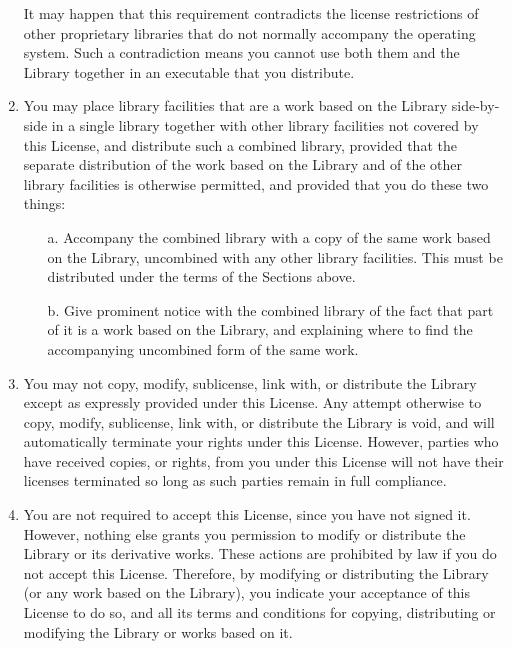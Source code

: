 \begin{enumerate}
  It may happen that this requirement contradicts the license
restrictions of other proprietary libraries that do not normally
accompany the operating system.  Such a contradiction means you cannot
use both them and the Library together in an executable that you
distribute.

\item You may place library facilities that are a work based on the
Library side-by-side in a single library together with other library
facilities not covered by this License, and distribute such a combined
library, provided that the separate distribution of the work based on
the Library and of the other library facilities is otherwise
permitted, and provided that you do these two things:

\begin{enumerate}
\item[a.] Accompany the combined library with a copy of the same work
    based on the Library, uncombined with any other library
    facilities.  This must be distributed under the terms of the
    Sections above.

\item[b.] Give prominent notice with the combined library of the fact
    that part of it is a work based on the Library, and explaining
    where to find the accompanying uncombined form of the same work.
\end{enumerate}

\item You may not copy, modify, sublicense, link with, or distribute
the Library except as expressly provided under this License.  Any
attempt otherwise to copy, modify, sublicense, link with, or
distribute the Library is void, and will automatically terminate your
rights under this License.  However, parties who have received copies,
or rights, from you under this License will not have their licenses
terminated so long as such parties remain in full compliance.

\item You are not required to accept this License, since you have not
signed it.  However, nothing else grants you permission to modify or
distribute the Library or its derivative works.  These actions are
prohibited by law if you do not accept this License.  Therefore, by
modifying or distributing the Library (or any work based on the
Library), you indicate your acceptance of this License to do so, and
all its terms and conditions for copying, distributing or modifying
the Library or works based on it.


\end{enumerate}

